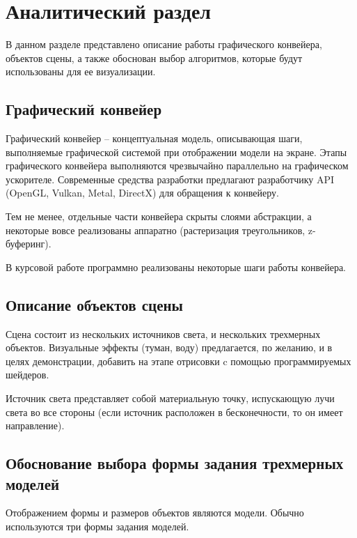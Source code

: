 \chapter{Аналитический раздел}
В данном разделе представлено описание работы графического конвейера, объектов сцены, а также обоснован выбор алгоритмов, которые будут использованы для ее визуализации. 

\section{Графический конвейер}

Графический конвейер – концептуальная модель, описывающая шаги, выполняемые графической системой при отображении модели на экране. Этапы графического конвейера выполняются чрезвычайно параллельно на графическом ускорителе.
Современные средства разработки предлагают разработчику API (OpenGL, Vulkan, Metal, DirectX) для обращения к конвейеру. 

Тем не менее, отдельные части конвейера скрыты слоями абстракции, а некоторые вовсе реализованы аппаратно (растеризация треугольников, z-буферинг).

В курсовой работе программно реализованы некоторые шаги работы конвейера.

\section{Описание объектов сцены}

Сцена состоит из нескольких источников света, и нескольких  трехмерных объектов. Визуальные эффекты (туман, воду) предлагается, по желанию, и в целях демонстрации, добавить на этапе отрисовки c помощью программируемых шейдеров. 

Источник света представляет собой материальную точку, испускающую лучи света во все стороны (если источник расположен в бесконечности, то он имеет направление). 

\section{Обоснование выбора формы задания трехмерных моделей}
Отображением формы и размеров объектов являются модели. 
Обычно используются три формы задания моделей.


